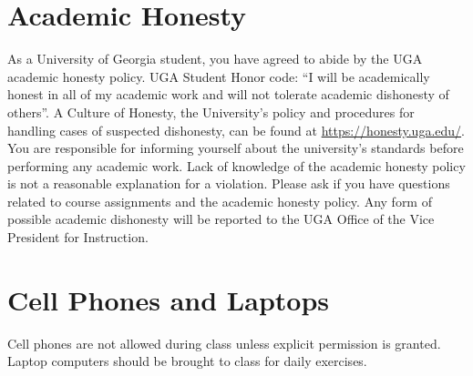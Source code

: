\documentclass[12pt]{article}
\begin{document}









\vspace{-2mm}
\section*{\normalsize Academic Honesty}
\vspace{-4mm}
As a University of Georgia student, you have agreed to abide by the
UGA academic honesty policy. UGA Student Honor code: “I will be
academically honest in all of my academic work and will not tolerate
academic dishonesty of others”. A Culture of Honesty, the University's
policy and procedures for handling cases of suspected dishonesty, can
be found at \url{https://honesty.uga.edu/}. You are responsible for
informing yourself about the university’s standards before performing
any academic work. Lack of knowledge of the academic honesty policy is
not a reasonable explanation for a violation. Please ask if you have
questions related to course assignments and the academic honesty
policy. Any form of possible academic dishonesty will be reported to
the UGA Office of the Vice President for Instruction.


\vspace{-2mm}
\section*{\normalsize Cell Phones and Laptops}
\vspace{-4mm}
Cell phones are not allowed during class unless explicit permission is
granted. Laptop computers should be brought to class for daily
exercises.
\end{document}
